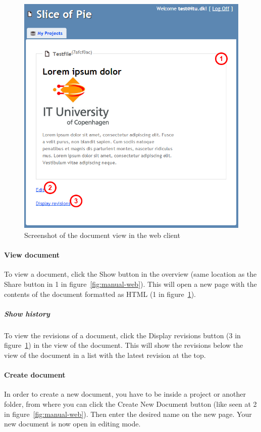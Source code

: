 	\begin{figure}[htb]
		\centering
		\includegraphics[width=1\textwidth]{User_manual/graphics/web-document.png}
		\caption{Screenshot of the document view in the web client}
		\label{fig:manual-web-document}
	\end{figure}

	\paragraph{View document}
	To view a document, click the Show button in the overview (same location as the Share button in 1 in figure~\ref{fig:manual-web}). This will open a new page with the contents of the document formatted as HTML (1 in figure~\ref{fig:manual-web-document}).
		
		\subparagraph{Show history}
		To view the revisions of a document, click the Display revisions button (3 in figure~\ref{fig:manual-web-document}) in the view of the document. This will show the revisions below the view of the document in a list with the latest revision at the top.

	\paragraph{Create document}
	In order to create a new document, you have to be inside a project or another folder, from where you can click the Create New Document button (like seen at 2 in figure~\ref{fig:manual-web}). Then enter the desired name on the new page. Your new document is now open in editing mode.
	
